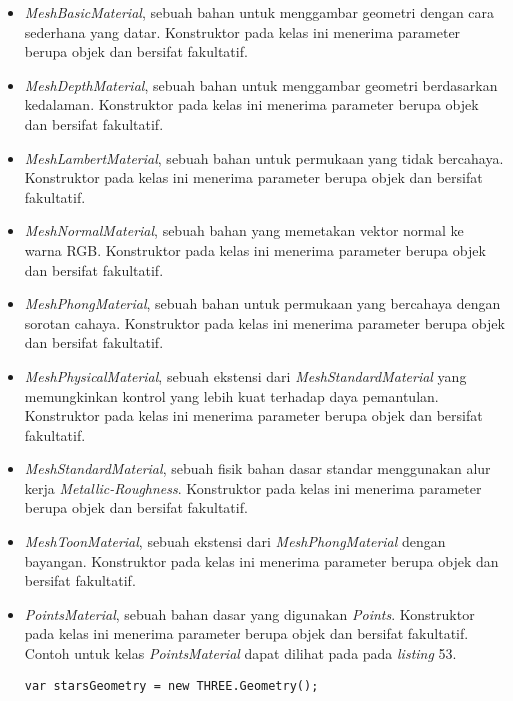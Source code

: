 \documentclass[a4paper,twoside]{article}
\begin{document}
\begin{enumerate}
\begin{itemize}
\begin{itemize}
	\item {\it MeshBasicMaterial}, sebuah bahan untuk menggambar geometri dengan cara sederhana yang datar. Konstruktor pada kelas ini menerima parameter berupa objek dan bersifat fakultatif.
	
	\item {\it MeshDepthMaterial}, sebuah bahan untuk menggambar geometri berdasarkan kedalaman. Konstruktor pada kelas ini menerima parameter berupa objek dan bersifat fakultatif.
	
	\item {\it MeshLambertMaterial}, sebuah bahan untuk permukaan yang tidak bercahaya. Konstruktor pada kelas ini menerima parameter berupa objek dan bersifat fakultatif.
	
	\item {\it MeshNormalMaterial}, sebuah bahan yang memetakan vektor normal ke warna RGB. Konstruktor pada kelas ini menerima parameter berupa objek dan bersifat fakultatif.
	
	\item {\it MeshPhongMaterial}, sebuah bahan untuk permukaan yang bercahaya dengan sorotan cahaya. Konstruktor pada kelas ini menerima parameter berupa objek dan bersifat fakultatif.
	
	\item {\it MeshPhysicalMaterial}, sebuah ekstensi dari {\it MeshStandardMaterial} yang memungkinkan kontrol yang lebih kuat terhadap daya pemantulan. Konstruktor pada kelas ini menerima parameter berupa objek dan bersifat fakultatif.
	
	\item {\it MeshStandardMaterial}, sebuah fisik bahan dasar standar menggunakan alur kerja {\it Metallic-Roughness}. Konstruktor pada kelas ini menerima parameter berupa objek dan bersifat fakultatif.
	
	\item {\it MeshToonMaterial}, sebuah ekstensi dari {\it MeshPhongMaterial} dengan bayangan. Konstruktor pada kelas ini menerima parameter berupa objek dan bersifat fakultatif.
	
	\item {\it PointsMaterial}, sebuah bahan dasar yang digunakan {\it Points}. Konstruktor pada kelas ini menerima parameter berupa objek dan bersifat fakultatif. Contoh untuk kelas {\it PointsMaterial} dapat dilihat pada pada {\it listing} 53.
	
\begin{lstlisting}[caption={Contoh penggunaan kelas {\it PointsMaterial}.},captionpos=b]
var starsGeometry = new THREE.Geometry();


\end{lstlisting}
\end{itemize}
\end{itemize}
\end{enumerate}
\end{document}
